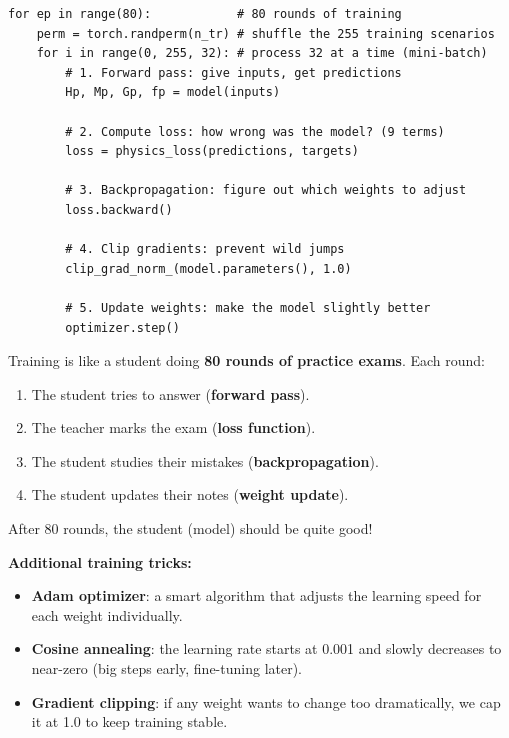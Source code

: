 \documentclass[11pt,a4paper]{article}
\begin{document}
\begin{lstlisting}
for ep in range(80):            # 80 rounds of training
    perm = torch.randperm(n_tr) # shuffle the 255 training scenarios
    for i in range(0, 255, 32): # process 32 at a time (mini-batch)
        # 1. Forward pass: give inputs, get predictions
        Hp, Mp, Gp, fp = model(inputs)

        # 2. Compute loss: how wrong was the model? (9 terms)
        loss = physics_loss(predictions, targets)

        # 3. Backpropagation: figure out which weights to adjust
        loss.backward()

        # 4. Clip gradients: prevent wild jumps
        clip_grad_norm_(model.parameters(), 1.0)

        # 5. Update weights: make the model slightly better
        optimizer.step()
\end{lstlisting}

\begin{analogybox}
Training is like a student doing \textbf{80 rounds of practice exams}.
Each round:
\begin{enumerate}[nosep]
  \item The student tries to answer (\textbf{forward pass}).
  \item The teacher marks the exam (\textbf{loss function}).
  \item The student studies their mistakes (\textbf{backpropagation}).
  \item The student updates their notes (\textbf{weight update}).
\end{enumerate}
After 80 rounds, the student (model) should be quite good!
\end{analogybox}

\textbf{Additional training tricks:}
\begin{itemize}[nosep]
  \item \textbf{Adam optimizer}: a smart algorithm that adjusts the
        learning speed for each weight individually.
  \item \textbf{Cosine annealing}: the learning rate starts at 0.001
        and slowly decreases to near-zero (big steps early,
        fine-tuning later).
  \item \textbf{Gradient clipping}: if any weight wants to change too
        dramatically, we cap it at 1.0 to keep training stable.
\end{itemize}


\end{document}
